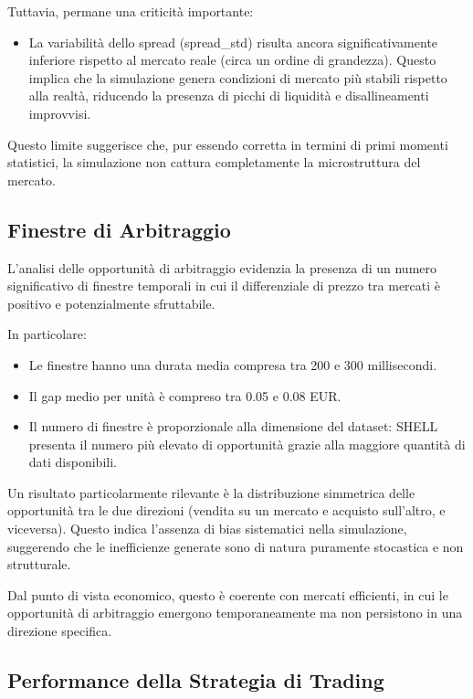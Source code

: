 \documentclass[10pt,final]{article}
\begin{document}
Tuttavia, permane una criticità importante:

\begin{itemize}
    \item La variabilità dello spread (spread\_std) risulta ancora significativamente inferiore rispetto al mercato reale (circa un ordine di grandezza). Questo implica che la simulazione genera condizioni di mercato più stabili rispetto alla realtà, riducendo la presenza di picchi di liquidità e disallineamenti improvvisi.
\end{itemize}

Questo limite suggerisce che, pur essendo corretta in termini di primi momenti statistici, la simulazione non cattura completamente la microstruttura del mercato.

\subsection{Finestre di Arbitraggio}

L'analisi delle opportunità di arbitraggio evidenzia la presenza di un numero significativo di finestre temporali in cui il differenziale di prezzo tra mercati è positivo e potenzialmente sfruttabile.

In particolare:

\begin{itemize}
    \item Le finestre hanno una durata media compresa tra 200 e 300 millisecondi.
    \item Il gap medio per unità è compreso tra 0.05 e 0.08 EUR.
    \item Il numero di finestre è proporzionale alla dimensione del dataset: SHELL presenta il numero più elevato di opportunità grazie alla maggiore quantità di dati disponibili.
\end{itemize}

Un risultato particolarmente rilevante è la distribuzione simmetrica delle opportunità tra le due direzioni (vendita su un mercato e acquisto sull'altro, e viceversa). Questo indica l'assenza di bias sistematici nella simulazione, suggerendo che le inefficienze generate sono di natura puramente stocastica e non strutturale.

Dal punto di vista economico, questo è coerente con mercati efficienti, in cui le opportunità di arbitraggio emergono temporaneamente ma non persistono in una direzione specifica.

\subsection{Performance della Strategia di Trading}
\end{document}

